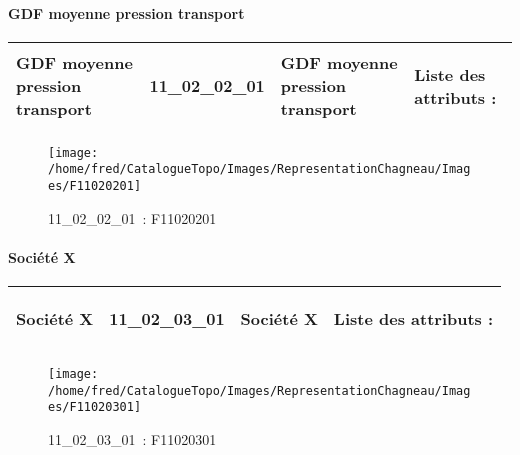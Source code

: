 \documentclass[12pt,titlepage,oneside]{book}
\begin{document}
\paragraph{GDF moyenne pression transport}
\noindent
\vspace{\baselineskip}

\renewcommand{\arraystretch}{1.2}
\begin{supertabular}{|p{10cm}|c|p{13cm}|p{12cm}|}
 GDF moyenne pression transport & 11\_02\_02\_01 & GDF moyenne pression transport & Liste des attributs :
\begin{enumerate}
\end{enumerate}
\\
\hline
\end{supertabular}
\begin{figure}[h!]
  \hfill         %
  \begin{minipage}[t]{3cm}
    \begin{center}
      \texttt{[image: /home/fred/CatalogueTopo/Images/RepresentationChagneau/Images/F11020201]}
      \caption[~11\_02\_02\_01]{\small{11\_02\_02\_01~:} \tiny{F11020201}}\label{F11020201}
    \end{center}
  \end{minipage}
\end{figure}


\paragraph{Société X}
\noindent
\vspace{\baselineskip}

\renewcommand{\arraystretch}{1.2}
\begin{supertabular}{|p{10cm}|c|p{13cm}|p{12cm}|}
 Société X & 11\_02\_03\_01 & Société X & Liste des attributs :
\begin{enumerate}
\end{enumerate}
\\
\hline
\end{supertabular}
\begin{figure}[h!]
  \hfill         %
  \begin{minipage}[t]{3cm}
    \begin{center}
      \texttt{[image: /home/fred/CatalogueTopo/Images/RepresentationChagneau/Images/F11020301]}
      \caption[~11\_02\_03\_01]{\small{11\_02\_03\_01~:} \tiny{F11020301}}\label{F11020301}
    \end{center}
  \end{minipage}
\end{figure}
\end{document}
